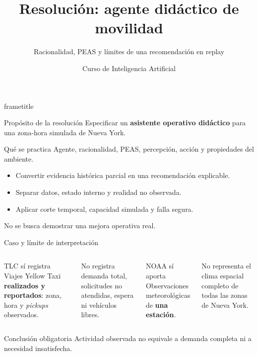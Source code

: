 \documentclass[aspectratio=169,11pt]{beamer}
\title[IA · Agente didáctico]{Resolución: agente didáctico de movilidad}
\subtitle{Racionalidad, PEAS y límites de una recomendación en replay}
\author{Curso de Inteligencia Artificial}
\institute{Semana 1 · Resolución de actividad}
\date{}
\newcommand{\concepto}[1]{\textcolor{UAPTeal}{\textbf{#1}}}
\begin{document}
\begin{frame}[plain]
  \begin{beamercolorbox}[wd=\paperwidth,ht=\paperheight,sep=2em]{frametitle}
    \vfill {\Huge\bfseries\inserttitle\par}\vspace{.5em}
    {\color{UAPGold}\Large\insertsubtitle\par}\vspace{2em}
    {\color{white}\large\insertauthor\par\insertinstitute\par}\vfill
  \end{beamercolorbox}
\end{frame}

\begin{frame}{Propósito de la resolución}
  Especificar un \concepto{asistente operativo didáctico} para una zona-hora simulada de Nueva York.
  \begin{block}{Qué se practica}
    Agente, racionalidad, PEAS, percepción, acción y propiedades del ambiente.
  \end{block}
  \begin{itemize}
    \item Convertir evidencia histórica parcial en una recomendación explicable.
    \item Separar datos, estado interno y realidad no observada.
    \item Aplicar corte temporal, capacidad simulada y falla segura.
  \end{itemize}
  \alert{No se busca demostrar una mejora operativa real.}
\end{frame}

\begin{frame}{Caso y límite de interpretación}
  \begin{columns}[T]
      \begin{block}{TLC sí registra}
        Viajes Yellow Taxi \textbf{realizados y reportados}: zona, hora y \textit{pickups} observados.
      \end{block}
      No registra demanda total, solicitudes no atendidas, espera ni vehículos libres.
      \begin{block}{NOAA sí aporta}
        Observaciones meteorológicas de \textbf{una estación}.
      \end{block}
      No representa el clima espacial completo de todas las zonas de Nueva York.
  \end{columns}
  \vfill
  \begin{alertblock}{Conclusión obligatoria}
    Actividad observada no equivale a demanda completa ni a necesidad insatisfecha.
  \end{alertblock}
\end{frame}
\end{document}
